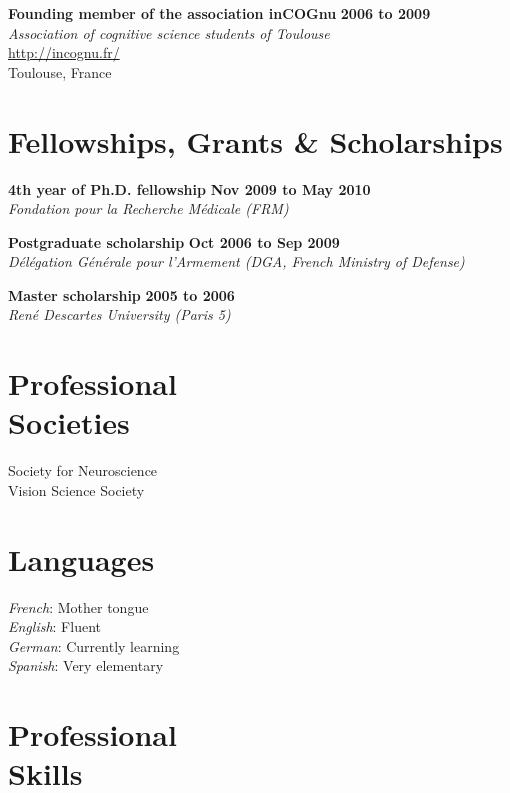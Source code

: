 \documentclass[margin,line]{resume}
\begin{document}
\begin{resume}
	\textbf{Founding member of the association inCOGnu} \hfill \textbf{2006 to 2009}\\
	\textsl{Association of cognitive science students of Toulouse}\\
	 \url{http://incognu.fr/}\\
	Toulouse, France



\vspace{3mm}
    \section{\mysidestyle Fellowships, Grants \& Scholarships}

	\textbf{4th year of Ph.D. fellowship} \hfill \textbf{Nov 2009 to May 2010}\\
	\textsl{Fondation pour la Recherche Médicale (FRM)}

	\textbf{Postgraduate scholarship} \hfill \textbf{Oct 2006 to Sep 2009}\\ %
	\textsl{Délégation Générale pour l'Armement (DGA, French Ministry of Defense)}

	\textbf{Master scholarship} \hfill \textbf{2005 to 2006}\\
	\textsl{René Descartes University (Paris 5)}


\vspace{3mm}
    \section{\mysidestyle Professional\\Societies}
	Society for Neuroscience\\
	Vision Science Society
	
	
\vspace{3mm}
    \section{\mysidestyle Languages}
	\textsl{French}: Mother tongue\\
	\textsl{English}: Fluent\\
	\textsl{German}: Currently learning\\
	\textsl{Spanish}: Very elementary

\vspace{3mm}
    \section{\mysidestyle Professional\\Skills}


\end{resume}
\end{document}
